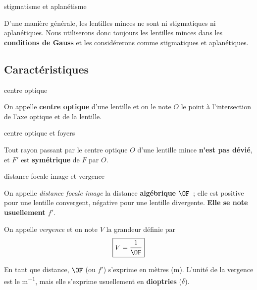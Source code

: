 \documentclass[../main/main.tex]{subfiles}
\begin{document}
    
\begin{ror}[label=impo:lent_gauss, hand]{stigmatisme et aplanétisme}

    D'une manière générale, les lentilles minces ne sont ni stigmatiques ni
    aplanétiques. Nous utiliserons donc toujours les lentilles minces dans
    les \textbf{conditions de Gauss} et les considérerons comme stigmatiques
    et aplanétiques.

\end{ror}

\subsection{Caractéristiques}

\begin{tcbraster}[raster columns=2, raster equal height=rows]
    \begin{defi}[label=def:co]{centre optique}

        On appelle \textbf{centre optique} d'une lentille et on le note $O$ le
        point à l'intersection de l'axe optique et de la lentille.

    \end{defi}
    \begin{prop}[label=prop:co]{centre optique et foyers}

        Tout rayon passant par le centre optique $O$ d'une lentille mince
        \textbf{n'est pas dévié}, et $F'$ est \textbf{symétrique} de $F$ par
        $O$.

    \end{prop}
    \begin{defi}[label=def:fv, raster multicolumn=2]{distance focale image
        et vergence}
        \begin{defiside}
            
            On appelle \textit{distance focale image} la distance
            \textbf{algébrique} $\OF$~; elle est positive pour une lentille
            convergent, négative pour une lentille divergente. \textbf{Elle se
            note usuellement $f'$}.

            \tcblower

            On appelle \textit{vergence} et on note $V$ la grandeur définie par
            \[ \boxed{V = \frac{1}{\OF}}\]

        \end{defiside}
        \begin{defiside}
            En tant que distance, $\OF$ (ou $f'$) s'exprime en mètres (m).
            \tcblower
            L'unité de la vergence est le \si{m^{-1}}, mais elle s'exprime
        usuellement en \textbf{dioptries} ($\delta$).
        \end{defiside}
    \end{defi}
\end{tcbraster}
\end{document}
